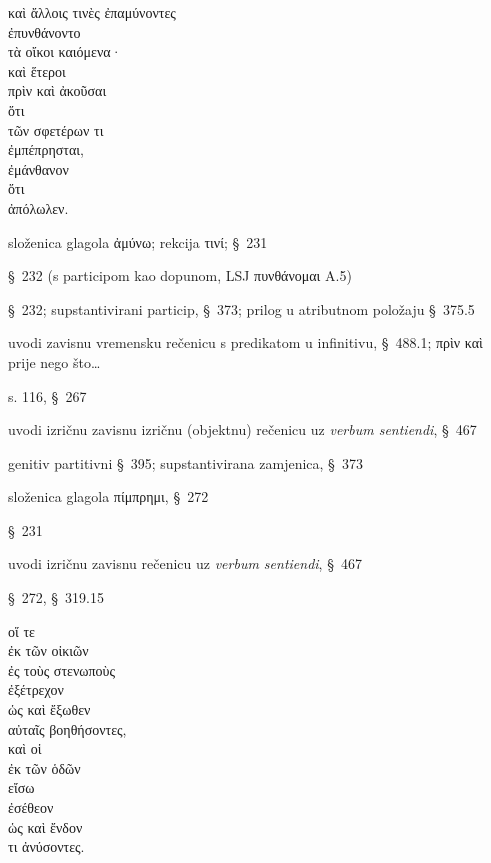 

{\large
\begin{greek}
\noindent καὶ ἄλλοις τινὲς ἐπαμύνοντες \\
ἐπυνθάνοντο \\
τὰ οἴκοι καιόμενα· \\
καὶ ἕτεροι \\
\tabto{2em} πρὶν καὶ ἀκοῦσαι \\
\tabto{4em} ὅτι\\
\tabto{6em} τῶν σφετέρων τι \\
\tabto{4em} ἐμπέπρησται, \\
ἐμάνθανον \\
\tabto{2em} ὅτι \\
\tabto{4em} ἀπόλωλεν. \\


\end{greek}
}

\begin{description}[noitemsep]
\item[ἐπαμύνοντες] složenica glagola ἀμύνω; rekcija τινί; §~231
\item[ἐπυνθάνοντο] §~232 (s participom kao dopunom, LSJ πυνθάνομαι A.5)
\item[τὰ οἴκοι καιόμενα] §~232; supstantivirani particip, §~373; prilog u atributnom položaju §~375.5
\item[πρὶν] uvodi zavisnu vremensku rečenicu s predikatom u infinitivu, §~488.1; πρὶν καὶ prije nego što\dots
\item[ἀκοῦσαι] s. 116, §~267
\item[ὅτι] uvodi izričnu zavisnu izričnu (objektnu) rečenicu uz \textit{verbum sentiendi}, §~467
\item[τῶν σφετέρων] genitiv partitivni §~395; supstantivirana zamjenica, §~373
\item[ἐμπέπρησται] složenica glagola πίμπρημι, §~272
\item[ἐμάνθανον] §~231
\item[ὅτι] uvodi izričnu zavisnu rečenicu uz \textit{verbum sentiendi}, §~467
\item[ἀπόλωλεν] §~272, §~319.15

\end{description}



{\large
\begin{greek}
\noindent οἵ τε \\
\tabto{2em} ἐκ τῶν οἰκιῶν \\
\tabto{2em} ἐς τοὺς στενωποὺς \\
ἐξέτρεχον \\
\tabto{2em} ὡς καὶ ἔξωθεν \\
\tabto{2em} αὐταῖς βοηθήσοντες, \\
καὶ οἱ \\
\tabto{2em} ἐκ τῶν ὁδῶν \\
\tabto{2em} εἴσω \\
ἐσέθεον \\
\tabto{2em} ὡς καὶ ἔνδον \\
\tabto{2em} τι ἀνύσοντες.\\

\end{greek}
}

